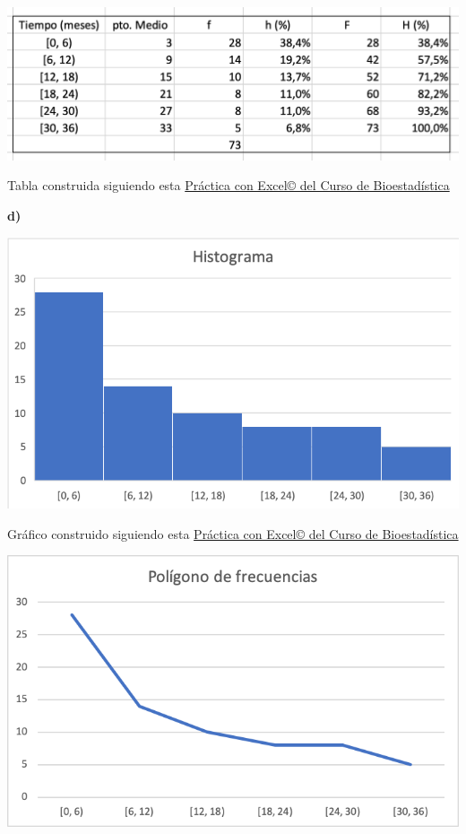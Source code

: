 \documentclass[
]{book}
\begin{document}
\includegraphics[width=16.19in]{img/1_2}

Tabla construida siguiendo esta \href{https://1fjmanzano.github.io/bioestadistica/tablas-de-frecuencias.html\#tabla-de-frecuencias-pr\%C3\%A1ctica-con-excel}{Práctica con Excel© del Curso de Bioestadística}

\textbf{d)}

\includegraphics[width=10in]{img/1_3}

Gráfico construido siguiendo esta \href{https://1fjmanzano.github.io/bioestadistica/histogramas.html\#histogramas-con-excel-pr\%C3\%A1cticas}{Práctica con Excel© del Curso de Bioestadística}

\includegraphics[width=10.03in]{img/1_4}
\end{document}
